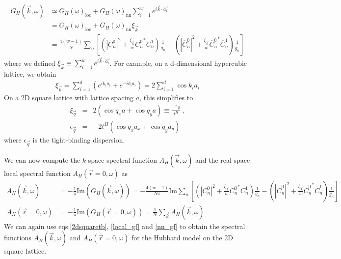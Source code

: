 \documentclass{report}
\numberwithin{equation}{section}
\begin{document}
\begin{equation}\begin{aligned}
	\label{k_Gf}
	G_H (\vec k, \omega) &\simeq G_H (\omega)_\text{loc} + G_H (\omega)_\text{nn}\sum_{i=1}^w e^{i \vec{k}\cdot\vec {a_i}}\\
			     &= G_H (\omega)_\text{loc} + G_H (\omega)_\text{nn} \xi_{\vec k}\\
			     &= \frac{4(w-1)}{N}\sum_n\left[\left(|C^0_{n}|^2 + \frac{\xi_{\vec{k}}}{w}{C^0_{n}}^* C^1_{n} \right)\frac{1}{g_n} - \left(|\overline C^0_{n}|^2 + \frac{\xi_{\vec{k}}}{w}{\overline C^0_{n}}^* \overline C^1_{n}\right)\frac{1}{\overline{g_n}}\right]
\end{aligned}\end{equation}
where we defined \(\xi_{\vec k} \equiv \sum_{i=1}^w e^{i \vec{k}\cdot\vec {a_i}}\). For example, on a d-dimensional hypercubic lattice, we obtain
\begin{equation}\begin{aligned}
	\xi_{\vec k} = \sum_{i=1}^d \left(e^{i k_i {a_i}} + e^{-i k_i {a_i}}\right) = 2\sum_{i=1}^d \cos k_i a_i
\end{aligned}\end{equation}
On a 2D square lattice with lattice spacing $a$, this simplifies to
\begin{eqnarray}
\xi_{\vec{q}} &=& 2(\cos q_{x}a + \cos q_{y}a)\equiv \frac{-\epsilon_{\vec{q}}}{t^{H}}~,\nonumber\\
\epsilon_{\vec{q}} &=& -2t^{H}(\cos q_{x}a_{x} + \cos q_{y}a_{y})~
\end{eqnarray}
where \(\epsilon_{\vec{q}}\) is the tight-binding dispersion.

We can now compute the $k$-space spectral function $A_{H}(\vec{k},\omega)$ and the real-space local spectral function $A_{H}(\vec{r}=0,\omega)$ as
\begin{equation}\begin{aligned}
	A_{H}(\vec{k},\omega) &= -\frac{1}{\pi} \textrm{Im}(G_{H}(\vec{k},\omega)) = -\frac{4(w-1)}{N\pi} \textrm{Im}\sum_n\left[\left(|C^0_{n}|^2 + \frac{\xi_{\vec{k}}}{w}{C^0_{n}}^* C^1_{n} \right)\frac{1}{g_n} - \left(|\overline C^0_{n}|^2 + \frac{\xi_{\vec{k}}}{w}{\overline C^0_{n}}^* \overline C^1_{n}\right)\frac{1}{\overline{g_n}}\right]\\
A_{H}(\vec{r}=0,\omega) &= -\frac{1}{\pi} \textrm{Im}(G_{H}(\vec{r}=0,\omega)) = \frac{1}{N}\sum_{\vec{k}}A_{H}(\vec{k},\omega)
\end{aligned}\end{equation}
We can again use eqs.\eqref{2dsquaretb}, \eqref{local_gf} and \eqref{nn_gf} to obtain the spectral functions  $A_{H} (\vec{k},\omega)$ and $A_{H} (\vec{r}=0,\omega)$ for the Hubbard model on the 2D square lattice.
\end{document}
